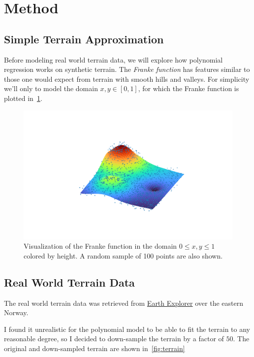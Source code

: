 \section{Method}\label{sec:Method}


\subsection{Simple Terrain Approximation}

Before modeling real world terrain data, we will explore how
polynomial regression works on synthetic terrain. The \textit{Franke function}
has features similar to those one would expect from terrain with smooth hills
and valleys. For simplicity we'll only to model the domain \(x, y \in [0,
1]\), for which the Franke function is plotted in~\cref{fig:franke}.


\begin{figure}[]
  \centering
  \includegraphics[trim={2cm 1cm 1cm 1cm},clip]{figures/franke.png}
  \caption{\label{fig:franke} Visualization of the Franke function in the domain
   \(0 \leq x, y \leq 1\) colored by height. A random sample of 100 points are
   also shown.}
\end{figure}

\subsection{Real World Terrain Data}
\label{sec:real-world-terrain}

The real world terrain data was retrieved from
\href{https://earthexplorer.usgs.gov/}{Earth Explorer} over the eastern Norway.

I found it unrealistic for the polynomial model to be able to fit the terrain to
any reasonable degree, so I decided to down-sample the terrain by a factor of
\(50\). The original and down-sampled terrain are shown in~\cref{fig:terrain}

